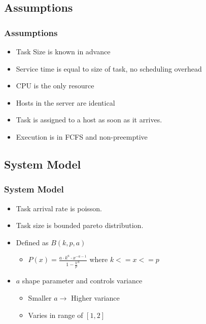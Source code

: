 \documentclass[red]{beamer}
\begin{document}
\subsection{Assumptions}
\begin{frame}
  \frametitle{Assumptions}   %
  \begin{itemize}
 	\item<1-> Task Size is known in advance
	\item<2-> Service time is equal to size of task, no scheduling overhead
	\item<3-> CPU is the only resource
	\item<4-> Hosts in the server are identical
	\item<5-> Task is assigned to a host as soon as it arrives.
	\item<6-> Execution is in FCFS and non-preemptive
  \end{itemize}
\end{frame}
\subsection{System Model}
\begin{frame}
	\frametitle{System Model}
	
  \begin{itemize}
 	\item<1-> Task arrival rate is poisson.
	\item<2-> Task size is bounded pareto distribution.
	\item<3-> Defined as $ B(k, p, a) $
		\begin{itemize}	
			\item $ P(x) = \frac{a \cdot k^a \cdot x^{-a-1}}{1 - {\frac{k}{p}}^a} $ where $ k <= x <= p $
		\end{itemize}
	\item<4-> $ a $ shape parameter and controls variance
		\begin{itemize}
			\item Smaller $ a \rightarrow $ Higher variance
			\item Varies in range of $ [1, 2] $
		\end{itemize}	
  \end{itemize}
 
\end{frame}
\end{document}
